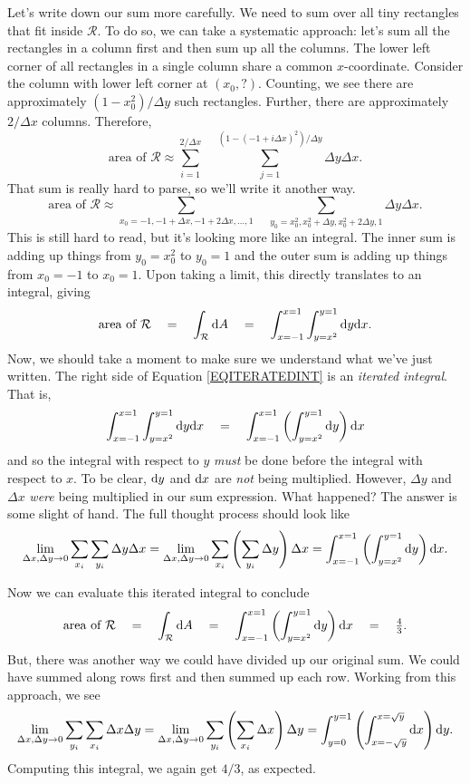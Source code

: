 Let's write down our sum more carefully.  We need to sum over all tiny rectangles that fit inside
$\mathcal R$.  To do so, we can take a systematic approach: let's sum all the rectangles
in a column first and then sum up all the columns.  The lower left corner of all 
rectangles in a single column share a common $x$-coordinate.  Consider
the column with lower left corner at $(x_0,?)$.  Counting, we see there
are approximately $(1-x_0^2)/\Delta y$ such rectangles.  Further, there are approximately
$2/\Delta x$ columns.  Therefore,
\[
	\text{area of }\mathcal R\approx 
	\sum_{i=1}^{2/\Delta x}\quad\sum_{j=1}^{(1-(-1+i\Delta x)^2)/\Delta y} \Delta y\Delta x.
\]
That sum is really hard to parse, so we'll write it another way.
\[
	\text{area of }\mathcal R\approx
	\sum_{x_0=-1,-1+\Delta x,-1+2\Delta x,\ldots,1}
	\quad
	\sum_{y_0=x_0^2,x_0^2+\Delta y,x_0^2+2\Delta y,1}
	\Delta y\Delta x.
\]
This is still hard to read, but it's looking more like an integral.  The inner sum
is adding up things from $y_0=x_0^2$ to $y_0=1$ and the outer sum is adding up
things from $x_0=-1$ to $x_0=1$.  Upon taking a limit, this directly translates to an
integral, giving
\begin{equation}
	\label{EQITERATEDINT}
	\text{area of }\mathcal R\quad
	=\quad
	\int_{\mathcal R}\mathrm{d} A \quad =\quad \int_{x=-1}^{x=1}\int_{y=x^2}^{y=1} \mathrm{d} y\mathrm{d} x.
\end{equation}
Now, we should take a moment to make sure we understand what we've just written.  The
right side of Equation \eqref{EQITERATEDINT} is an \emph{iterated integral}.
That is,
\[
	\int_{x=-1}^{x=1}\int_{y=x^2}^{y=1} \mathrm{d} y\mathrm{d} x
	\quad 
	=
	\quad \int_{x=-1}^{x=1}\left(\int_{y=x^2}^{y=1} \mathrm{d} y\right)\mathrm{d} x
\]
and so the integral with respect to $y$ \emph{must} be done before the integral with respect to $x$.
To be clear, $\mathrm{d} y$ and $\mathrm{d} x$ are \emph{not} being multiplied.  However, $\Delta y$ and $\Delta x$ 
\emph{were} being multiplied in our sum expression.  What happened?  The answer is some slight of
hand.  The full thought process should look like
\[
	\lim_{\Delta x,\Delta y\to 0} \sum_{x_i}\sum_{y_i} \Delta y\Delta x
	=
	\lim_{\Delta x,\Delta y\to 0} \sum_{x_i}\left(\sum_{y_i} \Delta y\right)\Delta x
	=\int_{x=-1}^{x=1}\left(\int_{y=x^2}^{y=1} \mathrm{d} y\right)\mathrm{d} x.
\]

Now we can evaluate this iterated integral to conclude
\[
	\text{area of }\mathcal R
	\quad
	=\quad
	\int_{\mathcal R}\mathrm{d} A \quad=\quad 
	\int_{x=-1}^{x=1}\left(\int_{y=x^2}^{y=1} \mathrm{d} y\right)\mathrm{d} x \quad=\quad
	\tfrac{4}{3}.
\]
But, there was another way we could have divided up our original sum.  We could have summed
along rows first and then summed up each row.  Working from this approach, we see
\[
	\lim_{\Delta x,\Delta y\to 0} \sum_{y_i}\sum_{x_i} \Delta x\Delta y
	=
	\lim_{\Delta x,\Delta y\to 0} \sum_{y_i}\left(\sum_{x_i} \Delta x\right)\Delta y
	=\int_{y=0}^{y=1}\left(\int_{x=-\sqrt{y}}^{x=\sqrt{y}} \mathrm{d} x\right)\mathrm{d} y.
\]
Computing this integral, we again get $4/3$, as expected.



